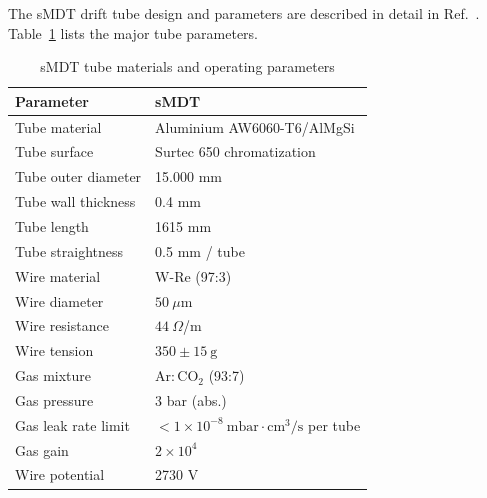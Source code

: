 The sMDT drift tube design and parameters are described in detail in Ref.~\cite{ATLAS-TDR-026}. Table~\ref{tab:parameters} lists the major tube parameters.
    \begin{table}[htbp]
        \centering
        \begin{tabular}{l|l}
             \hline
            Parameter & sMDT \\
            \hline
            Tube material & Aluminium AW6060-T6/AlMgSi \\
            Tube surface & Surtec 650 chromatization \\
            Tube outer diameter & 15.000 mm \\
            Tube wall thickness & 0.4 mm \\
            Tube length & 1615 mm \\
            Tube straightness & 0.5 mm / tube\\
            Wire material & W-Re (97:3) \\
            Wire diameter &  $50~\mu\text{m}$ \\
            Wire resistance & $44~\Omega$/m \\
            Wire tension & $350 \pm 15~\text{g}$ \\
            Gas mixture & $\text{Ar}:\text{CO}_2$ (93:7) \\
            Gas pressure & 3 bar (abs.) \\
            Gas leak rate limit & $< 1 \times 10^{-8}~\text{mbar}\cdot\text{cm}^3/\text{s}$ per tube\\
            Gas gain & $2 \times 10^4$ \\
            Wire potential & 2730 V \\
            \hline
        \end{tabular}
        \caption{\rm sMDT tube materials and operating parameters}
        \label{tab:parameters} 
    \end{table}

